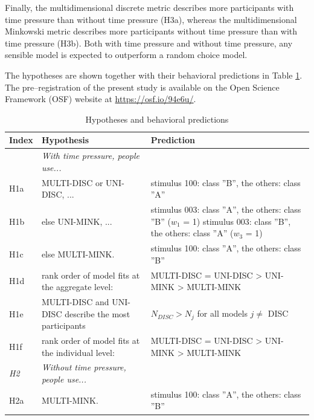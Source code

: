 \documentclass[a4paper,man,natbib]{apa6}
\begin{document}
Finally, the multidimensional discrete metric describes more participants with time pressure than without time pressure (H3a), whereas the multidimensional Minkowski metric describes more participants without time pressure than with time pressure (H3b). Both with time pressure and without time pressure, any sensible model is expected to outperform a random choice model. 

The hypotheses are shown together with their behavioral predictions in Table \ref{tab:hypotheses}. The pre--registration of the present study is available on the Open Science Framework (OSF) website at \href{https://osf.io/94e6u/}{https://osf.io/94e6u/}.

\begin{table}
\begin{center}
\begin{threeparttable}
\caption{Hypotheses and behavioral predictions}
\label{tab:hypotheses}
\begin{tabular*}{\textwidth}{lp{115mm}p{110mm}}
\toprule
\multicolumn{1}{l}{Index} & \multicolumn{1}{l}{Hypothesis} & \multicolumn{1}{l}{Prediction}\\
\midrule
\addlinespace
\multicolumn{1}{l}{\emph{H1}} & \multicolumn{1}{l}{\emph{With time pressure, people use...}} \\
\addlinespace
H1a & MULTI-DISC or UNI-DISC, ... & stimulus 100: class ''B'', the others: class ''A''\\
\addlinespace
H1b & else UNI-MINK, ...  & stimulus 003: class ''A'', the others: class ''B'' ($w_1$ = 1) \newline stimulus 003: class ''B'', the others: class ''A'' ($w_3$ = 1)\\
\addlinespace
H1c & else MULTI-MINK. & stimulus 100: class ''A'', the others: class ''B''\\
\addlinespace
H1d & rank order of model fits at the aggregate level: & MULTI-DISC = UNI-DISC > UNI-MINK > MULTI-MINK\\
\addlinespace
H1e & MULTI-DISC and UNI-DISC describe the most participants & $N_{DISC} > N_{j}$ for all models $j \neq$ DISC\\
\addlinespace
H1f & rank order of model fits at the individual level: & MULTI-DISC = UNI-DISC > UNI-MINK > MULTI-MINK\\
\midrule
\multicolumn{1}{l}{\emph{H2}} & \multicolumn{1}{l}{\emph{Without time pressure, people use...}} \\
\addlinespace
H2a & MULTI-MINK. & stimulus 100: class ''A'', the others: class ''B''\\

\end{tabular*}
\end{threeparttable}
\end{center}
\end{table}
\end{document}
